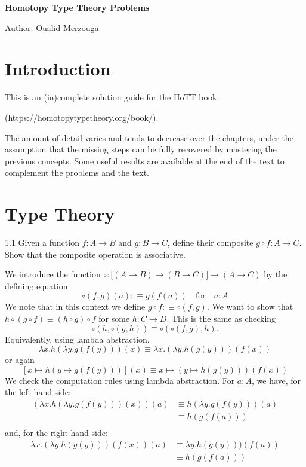 \documentclass[14pt]{extarticle}
\newcommand{\0}{{\mathbf 0}}
\newcommand{\1}{{\mathbf 1}}
\newcommand{\2}{{\mathbf 2}}
\newcommand{\mt}{\mapsto}
\begin{document}
\begin{center}
{\large \bf Homotopy Type Theory Problems} 


\begin{flushleft}
Author: Oualid Merzouga
\end{flushleft}
\vspace{12pt}

\end{center}


\section*{Introduction}
This is an (in)complete solution guide for the HoTT book 
\begin{center}(https://homotopytypetheory.org/book/).\end{center}
The amount of detail varies and tends to decrease over the chapters, under the assumption that the missing steps can be fully recovered by mastering the previous concepts.
Some useful results are available at the end of the text to complement the problems and the text.

\section*{Type Theory}
\begin{prob}{1.1}{}
Given a function $f : A \to B$ and $g : B \to C$, define their composite $g \circ f : A \to C$. Show that the composite operation is associative.
\end{prob}

We introduce the function $\circ : \big[(A \rightarrow B) \rightarrow (B \rightarrow C)\big] \rightarrow (A \rightarrow C)$ by the defining equation
\[\circ(f,g)(a) :\equiv g(f(a)) \quad \text{for} \quad a:A\]
We note that in this context we define $g \circ f :\equiv \circ(f,g)$. We want to show that $h \circ (g \circ f) \equiv (h \circ g) \circ f$ for some $h : C \rightarrow D$. This is the same as checking \[\circ(h, \circ(g,h)) \equiv \circ(\circ(f,g), h).\]
Equivalently, using lambda abstraction,
\[\lambda x.h(\lambda y. g(f(y)))(x) \equiv \lambda x.(\lambda y. h(g(y)))(f(x))\]
or again 
\[\left[x \mt h(y \mt g(f(y)))\right](x) \equiv x \mt (y \mt h(g(y)))(f(x))\]
We check the computation rules using lambda abstraction. For $a : A$, we have, for the left-hand side:
\begin{align*}
\left( \lambda x.h(\lambda y. g(f(y)))(x) \right)(a) &\equiv h(\lambda y. g(f(y)))(a) \\
&\equiv h(g(f(a))) \\
\end{align*}
and, for the right-hand side:
\begin{align*}
\lambda x.(\lambda y. h(g(y)))(f(x))(a) &\equiv \lambda y. h(g(y)))(f(a)) \\
&\equiv h(g(f(a))) \\
\end{align*}
\end{document}
